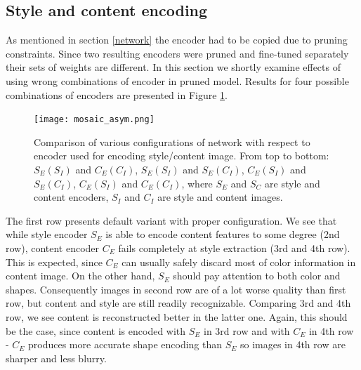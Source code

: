 \documentclass[../Main.tex]{subfiles}
\begin{document}
\subsection{Style and content encoding} \label{two_encoders}
As mentioned in section \ref{network} the encoder had to be copied due to pruning
constraints. Since two resulting encoders were pruned and fine-tuned separately 
their sets of weights are different. In this section we shortly examine effects
of using wrong combinations of encoder in pruned model. Results for four possible combinations
of encoders are presented in Figure \ref{fig:mosaic_asym}.

        \begin{figure}[h!]
        \centering
            \texttt{[image: mosaic\_asym.png]}
            \caption{Comparison of various configurations of network with respect
            to encoder used for encoding style/content image. From top to bottom:
            $S_E(S_I)$ and $C_E(C_I)$, $S_E(S_I)$ and $S_E(C_I)$,
            $C_E(S_I)$ and $S_E(C_I)$, $C_E(S_I)$ and $C_E(C_I)$, where
            $S_E$ and $S_C$ are style and content encoders, $S_I$ and $C_I$ are 
            style and content images.
            }
            \label{fig:mosaic_asym}
        \end{figure}
        
The first row presents default variant with proper configuration. 
We see that while style encoder $S_E$ is able to encode content features to some
degree (2nd row), content encoder $C_E$ fails completely at style extraction
(3rd and 4th row). This is expected, since $C_E$ can usually safely
discard most of color information in content image. On the other hand, $S_E$
should pay attention to both color and shapes. Consequently images in second row
are of a lot worse quality than first row, but content and style are still readily
recognizable. Comparing 3rd and 4th row, we see content 
is reconstructed better in the latter one. Again, this should be the case,
since content is encoded with $S_E$ in 3rd row and with $C_E$ in 4th row -
$C_E$ produces more accurate shape encoding than $S_E$ so images in 4th row are
sharper and less blurry.





\biblio %
\end{document}
